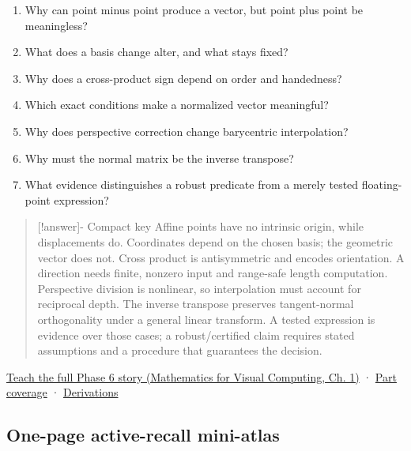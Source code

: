 \hypertarget{appendix-38d9c8aca357-retrieval-prompts}{}

\begin{enumerate}
\def\labelenumi{\arabic{enumi}.}
\tightlist
\item
  Why can point minus point produce a vector, but point plus point be meaningless?
\item
  What does a basis change alter, and what stays fixed?
\item
  Why does a cross-product sign depend on order and handedness?
\item
  Which exact conditions make a normalized vector meaningful?
\item
  Why does perspective correction change barycentric interpolation?
\item
  Why must the normal matrix be the inverse transpose?
\item
  What evidence distinguishes a robust predicate from a merely tested floating-point expression?
\end{enumerate}

\begin{quote}
{[}!answer{]}- Compact key Affine points have no intrinsic origin, while displacements do. Coordinates depend on the chosen basis; the geometric vector does not. Cross product is antisymmetric and encodes orientation. A direction needs finite, nonzero input and range-safe length computation. Perspective division is nonlinear, so interpolation must account for reciprocal depth. The inverse transpose preserves tangent-normal orthogonality under a general linear transform. A tested expression is evidence over those cases; a robust/certified claim requires stated assumptions and a procedure that guarantees the decision.
\end{quote}

\href{../02-Mathematics-for-Visual-Computing/main.pdf\#nameddest=01-foundations-i-ch017-the-panel-gives-us-a-reason-to-learn}{Teach the full Phase 6 story (Mathematics for Visual Computing, Ch. 1)} · \hyperref[appendix-fd090d982a15-phase-6---parts-501-600]{Part coverage} · \hyperref[02-foundations-ii-ch039-phase-6---geometry-reconstruction-proofs]{Derivations}

\subsection{One-page active-recall mini-atlas}\label{appendix-38d9c8aca357-one-page-active-recall-mini-atlas}

\hypertarget{appendix-38d9c8aca357-one-page-active-recall-mini-atlas}{}

